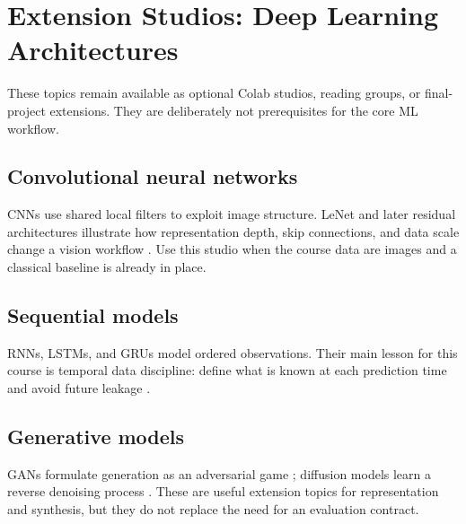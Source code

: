 \chapter{Extension Studios: Deep Learning Architectures}
These topics remain available as optional Colab studios, reading groups, or final-project extensions. They are deliberately not prerequisites for the core ML workflow.

\section{Convolutional neural networks}
CNNs use shared local filters to exploit image structure. LeNet and later residual architectures illustrate how representation depth, skip connections, and data scale change a vision workflow \citep{lecun1998}. Use this studio when the course data are images and a classical baseline is already in place.

\section{Sequential models}
RNNs, LSTMs, and GRUs model ordered observations. Their main lesson for this course is temporal data discipline: define what is known at each prediction time and avoid future leakage \citep{hochreiter1997}.

\section{Generative models}
GANs formulate generation as an adversarial game \citep{goodfellow2014}; diffusion models learn a reverse denoising process \citep{ho2020}. These are useful extension topics for representation and synthesis, but they do not replace the need for an evaluation contract.
